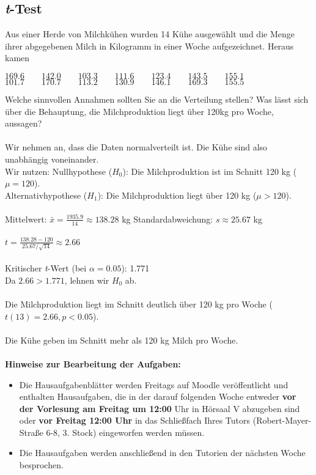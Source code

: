 \documentclass[a4paper]{article}
\begin{document}
\subsection{\textit{t}-Test}
Aus einer Herde von Milchkühen wurden 14 Kühe ausgewählt und die Menge ihrer abgegebenen Milch in Kilogramm in einer Woche aufgezeichnet. Heraus kamen
\begin{center} \(169.6\qquad142.0\qquad103.3\qquad111.6\qquad123.4\qquad143.5\qquad155.1\)\\
\(101.7\qquad170.7\qquad113.2\qquad130.9\qquad146.1\qquad169.3\qquad155.5\)
\end{center}
Welche sinnvollen Annahmen sollten Sie an die Verteilung stellen? Was lässt sich über die Behauptung, die Milchproduktion liegt über 120kg pro Woche, aussagen?\\\\
Wir nehmen an, dass die Daten normalverteilt ist. Die Kühe sind also unabhängig voneinander.\\
Wir nutzen:
Nullhypothese (\( H_0 \)): Die Milchproduktion ist im Schnitt 120 kg (\( \mu = 120 \)).\\
Alternativhypothese (\( H_1 \)): Die Milchproduktion liegt über 120 kg (\( \mu > 120 \)).\\\\
Mittelwert: \( \bar{x} = \frac{1935.9}{14} \approx 138.28 \) kg
Standardabweichung: \( s \approx 25.67 \) kg\\\\
\(t = \frac{138.28 - 120}{25.67 / \sqrt{14}} \approx 2.66\)\\\\
Kritischer \textit{t}-Wert (bei \( \alpha = 0.05 \)): 1.771\\
Da \( 2.66 > 1.771 \), lehnen wir \( H_0 \) ab.\\\\
Die Milchproduktion liegt im Schnitt deutlich über 120 kg pro Woche (\( t(13) = 2.66, p < 0.05 \)).\\\\
Die Kühe geben im Schnitt mehr als 120 kg Milch pro Woche.\\\\
\textbf{Hinweise zur Bearbeitung der Aufgaben:}
\begin{itemize}
    \item Die Hausaufgabenblätter werden Freitags auf Moodle veröffentlicht und enthalten Hausaufgaben, die in der darauf folgenden Woche entweder \textbf{vor der Vorlesung am Freitag um 12:00} Uhr in Hörsaal V abzugeben sind oder \textbf{vor Freitag 12:00 Uhr} in das Schließfach Ihres Tutors (Robert-Mayer-Straße 6-8, 3. Stock) eingeworfen werden müssen.
    \item Die Hausaufgaben werden anschließend in den Tutorien der nächsten Woche besprochen.
\end{itemize}
\end{document}
